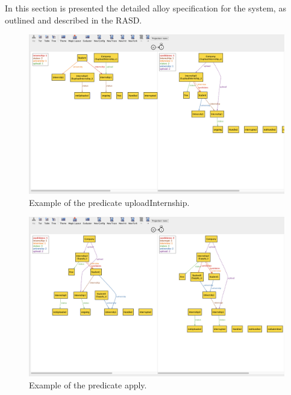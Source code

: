 In this section is presented the detailed alloy specification for the system, as outlined and described in the RASD. \\


\newpage

\begin{figure}[H]
    \begin{center}
        \includegraphics[width=\linewidth]{Images/Alloy/uploadInternship.png}
        \caption{Example of the predicate uploadInternship.}
        \label{fig:upload_intern_alloy}%
    \end{center}
\end{figure}

\begin{figure}[H]
    \begin{center}
        \includegraphics[width=\linewidth]{Images/Alloy/apply.png}
        \caption{Example of the predicate apply.}
        \label{fig:apply_alloy}%
    \end{center}
\end{figure}

